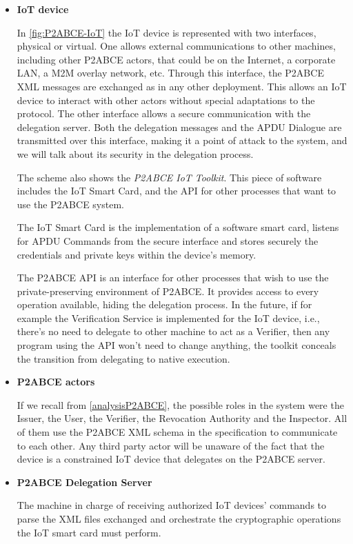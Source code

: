 \begin{itemize}
	
	\item \textbf{IoT device}
	
	In \autoref{fig:P2ABCE-IoT} the IoT device is represented with two interfaces, physical or virtual. One allows external communications to other machines, including other P2ABCE actors, that could be on the Internet, a corporate LAN, a M2M overlay network, etc. Through this interface, the P2ABCE XML messages are exchanged as in any other deployment. This allows an IoT device to interact with other actors without special adaptations to the protocol. The other interface allows a secure communication with the delegation server. Both the delegation messages and the APDU Dialogue are transmitted over this interface, making it a point of attack to the system, and we will talk about its security in the delegation process.
	
	The scheme also shows the \textit{P2ABCE IoT Toolkit}. This piece of software includes the IoT Smart Card, and the API for other processes that want to use the P2ABCE system.
	
	The IoT Smart Card is the implementation of a software smart card, listens for APDU Commands from the secure interface and stores securely the credentials and private keys within the device's memory.
	
	The P2ABCE API is an interface for other processes that wish to use the private-preserving environment of P2ABCE. It provides access to every operation available, hiding the delegation process. In the future, if for example the Verification Service is implemented for the IoT device, i.e., there's no need to delegate to other machine to act as a Verifier, then any program using the API won't need to change anything, the toolkit conceals the transition from delegating to native execution.
	
	
	\item \textbf{P2ABCE actors}
	
	If we recall from \autoref{analysisP2ABCE}, the possible roles in the system were the Issuer, the User, the Verifier, the Revocation Authority and the Inspector. All of them use the P2ABCE XML schema in the specification to communicate to each other. Any third party actor will be unaware of the fact that the device is a constrained IoT device that delegates on the P2ABCE server.



	\item \textbf{P2ABCE Delegation Server}
	
	The machine in charge of receiving authorized IoT devices' commands to parse the XML files exchanged and orchestrate the cryptographic operations the IoT smart card must perform.


\end{itemize}

